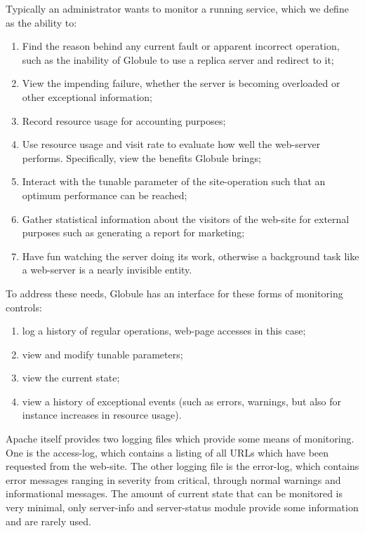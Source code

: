 \documentclass[10pt,a4paper]{article}
\makeatletter
\newenvironment{p}{\@open{P}{}}{\@close{P}}
\newenvironment{p}{}{\par}
\makeatother
\begin{document}
\begin{p}
Typically an administrator wants to monitor a running service, which we define
as the ability to:
\begin{enumerate}
\item Find the reason behind any current fault or apparent incorrect
operation, such as the inability of Globule to use a replica server and
redirect to it;
\item View the impending failure, whether the server is becoming overloaded or
other exceptional information;
\item Record resource usage for accounting purposes;
\item Use resource usage and visit rate to evaluate how well the web-server
performs.  Specifically, view the benefits Globule brings;
\item Interact with the tunable parameter of the site-operation such that an
optimum performance can be reached;
\item Gather statistical information about the visitors of the web-site for
external purposes such as generating a report for marketing;
\item Have fun watching the server doing its work, otherwise a background task
like a web-server is a nearly invisible entity.
\end{enumerate}
\end{p}

\begin{p}
To address these needs, Globule has an interface for these forms of
monitoring controls:
\begin{enumerate}
\item log a history of regular operations, web-page accesses in this case;
\item view and modify tunable parameters;
\item view the current state;
\item view a history of exceptional events (such as errors, warnings, but also
for instance increases in resource usage).
\end{enumerate}
\end{p}

\begin{p}
Apache itself provides two logging files which provide some means of
monitoring.  One is the access-log, which contains a listing of all URLs which
have been requested from the web-site.  The other logging file is the
error-log, which contains error messages ranging in severity from critical,
through normal warnings and informational messages.  The amount of current
state that can be monitored is very minimal, only server-info and
server-status module provide some information and are rarely used.
\end{p}
\end{document}
